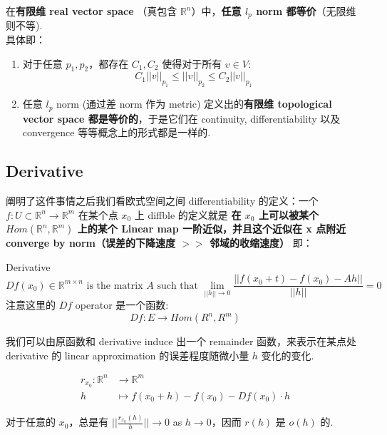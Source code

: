 \documentclass[lang=cn,11pt]{elegantbook}
\begin{document}
\begin{theorem}
    在\textbf{有限维 real vector space} （真包含 $\mathbb{R}^n$）中，\textbf{任意 $l_p$ norm 都等价}（无限维则不等).\\
    具体即：
    \begin{enumerate}
        \item 对于任意 $p_1, p_2$，都存在 $C_1, C_2$ 使得对于所有 $v\in V$:
        $$
        C_1||v||_{p_1} \leq ||v||_{p_2} \leq C_2||v||_{p_1}
        $$
        \item 任意 $l_p$ norm (通过差 norm 作为 metric) 定义出的\textbf{有限维 topological vector space 都是等价的}，于是它们在 continuity, differentiability 以及 convergence 等等概念上的形式都是一样的.
    \end{enumerate}
\end{theorem}

\subsection{Derivative}
\noindent 阐明了这件事情之后我们看欧式空间之间 differentiability 的定义：一个 $f: U \subset \mathbb{R}^n \rightarrow \mathbb{R}^m$ 在某个点 $x_0$ 上 diffble 的定义就是 \textbf{在 $x_0$ 上可以被某个 $Hom(\mathbb{R}^n, \mathbb{R}^m)$ 上的某个 Linear map 一阶近似，并且这个近似在 x 点附近 converge by norm（误差的下降速度 $>>$ 邻域的收缩速度）}
即：
\begin{definition}{Derivative} \label{derivartive}
    $$
    Df(x_0) \in \mathbb{R}^{m \times n} \text{ is the matrix } A \text{ such that } \lim_{||h|| \rightarrow 0} \frac{||f(x_0 + t) - f(x_0) - Ah||}{||h||} = 0
    $$
    注意这里的 $Df$ operator 是一个函数:
    $$
    Df : E \rightarrow Hom(R^n, R^m)
    $$
\end{definition}

我们可以由原函数和 derivative induce 出一个 remainder 函数，来表示在某点处 derivative 的 linear approximation 的误差程度随微小量 $h$ 变化的变化. 

\begin{definition}
\begin{align}
    r_{x_0} : \mathbb{R}^n &  \rightarrow \mathbb{R}^m \\
    h & \mapsto f(x_0 + h) - f(x_0) - Df(x_0) \cdot h
\end{align}
\end{definition}

\noindent 对于任意的 $x_0$，总是有 $||\frac{r_{x_0}(h)}{h}|| \rightarrow 0$ as $h \rightarrow 0$，因而 $r(h)$ 是 $o(h)$ 的.
\end{document}
